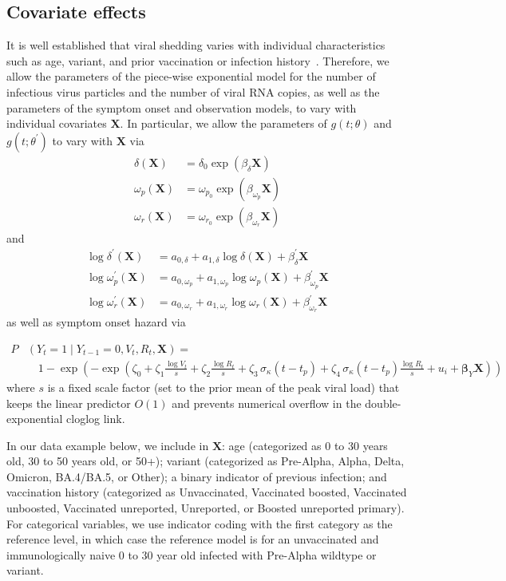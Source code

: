 \documentclass[12pt]{article}
\begin{document}
\subsection{Covariate effects} 
It is well established that viral shedding varies with individual characteristics such as age, variant, and prior vaccination or infection history~\cite{hay2022quantifying}. Therefore, we allow the parameters of the piece-wise exponential model for the number of infectious virus particles and the number of viral RNA copies, as well as the parameters of the symptom onset and observation models, to vary with individual covariates $\mathbf{X}$. In particular, we allow the parameters of $g(t; \theta)$ and $g(t; \theta^\prime)$ to vary with $\mathbf{X}$ via
\begin{align*}
    \delta(\mathbf{X}) &= \delta_0 \exp(\beta_\delta \mathbf{X}) \\
    \omega_{p}(\mathbf{X}) &= \omega_{p_0} \exp(\beta_{\omega_p} \mathbf{X}) \\
    \omega_{r}(\mathbf{X}) &= \omega_{r_0} \exp(\beta_{\omega_r} \mathbf{X})
\end{align*}
and 
\begin{align*}
    \log \delta^\prime(\mathbf{X}) &= a_{0,\delta} + a_{1,\delta} \log \delta(\mathbf{X}) + \beta^\prime_\delta \mathbf{X} \\
    \log \omega^\prime_{p}(\mathbf{X}) &= a_{0,\omega_p} + a_{1,\omega_p} \log \omega_{p}(\mathbf{X}) + \beta^\prime_{\omega_p} \mathbf{X} \\
    \log \omega^\prime_{r}(\mathbf{X}) &= a_{0,\omega_r} + a_{1,\omega_r} \log \omega_{r}(\mathbf{X}) + \beta^\prime_{\omega_r} \mathbf{X}
\end{align*}
as well as symptom onset hazard via

\begin{align*}
    P&(Y_t = 1 \mid Y_{t-1}=0, V_t, R_t, \mathbf{X}) = \\
    &\quad 1 - \exp\!\left(-\exp\!\left(\zeta_0 + \zeta_1 \frac{\log V_t}{s} + \zeta_2 \frac{\log R_t}{s} + \zeta_3 \,\sigma_\kappa(t - t_p) + \zeta_4 \,\sigma_\kappa(t - t_p) \frac{\log R_t}{s} + u_i + \boldsymbol{\beta}_{Y} \mathbf{X}\right)\right)
\end{align*}
where $s$ is a fixed scale factor (set to the prior mean of the peak viral load) that keeps the linear predictor $O(1)$ and prevents numerical overflow in the double-exponential cloglog link.

In our data example below, we include in $\mathbf{X}$: age (categorized as 0 to 30 years old, 30 to 50 years old, or 50+); variant (categorized as Pre-Alpha, Alpha, Delta, Omicron, BA.4/BA.5, or Other); a binary indicator of previous infection; and vaccination history (categorized as Unvaccinated, Vaccinated boosted, Vaccinated unboosted, Vaccinated unreported, Unreported, or Boosted unreported primary). For categorical variables, we use indicator coding with the first category as the reference level, in which case the reference model is for an unvaccinated and immunologically naive 0 to 30 year old infected with Pre-Alpha wildtype or variant.
\end{document}
